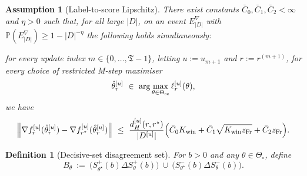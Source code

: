 \documentclass{statsoc}
\newtheorem{definition}[definition]{Definition}
\newtheorem{assumption}[assumption]{Assumption}
\newcommand{\bbP}{\mathbb{P}}
\newcommand{\1}{\mathbbm{1}}
\newcommand{\Tmax}{\mathfrak{T}}
\begin{document}
\begin{assumption}[Label-to-score Lipschitz]\label{ass:G7prime}
There exist constants $\bar C_0,\bar C_1,\bar C_2<\infty$ and $\eta>0$ such that, for all large $|D|$, on an event
$E^{\nabla}_{|D|}$ with $\bbP(E^{\nabla}_{|D|})\ge 1-|D|^{-\eta}$ the following holds simultaneously:

for every update index $m\in\{0,\dots,\Tmax-1\}$, letting $u:=u_{m+1}$ and $r:=r^{(m+1)}$, for every choice of
restricted M-step maximiser
\[
\hat\theta_r^{[u]}\ \in\ \arg\max_{\theta\in\Theta_{\rm sc}}\ell_r^{[u]}(\theta),
\]
we have
\[
\left\Vert \nabla f_{r}^{[u]}(\hat\theta_r^{[u]}) - \nabla f_{r^\star}^{[u]}(\hat\theta_r^{[u]})\right\Vert
\ \le\ 
\frac{d_H^{[u]}(r,r^\star)}{|D^{[u]}|}
\Big(\bar C_0 K_{\rm win} + \bar C_1\sqrt{K_{\rm win} z_{\rm Fr}} + \bar C_2 z_{\rm Fr}\Big).
\]
\end{assumption}


\begin{definition}[Decisive-set disagreement set]\label{def:Btheta}
For $b>0$ and any $\theta\in\Theta_\circ$, define
\[
B_\theta\ :=\ \big(S_{\theta^\star}^+(b) \Delta S_{\theta}^+(b)\big)\ \cup\ \big(S_{\theta^\star}^-(b) \Delta S_{\theta}^-(b)\big).
\]
\end{definition}
\end{document}

